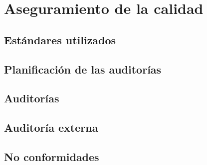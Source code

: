 \documentclass[10pt,spanish]{article}
\let\stdsection\section
\renewcommand\section{\newpage\stdsection}
\begin{document}

\section{Aseguramiento de la calidad}


\subsection{Estándares utilizados}


\subsection{Planificación de las auditorías}


\subsection{Auditorías}


\subsection{Auditoría externa}


\subsection{No conformidades}


\end{document}
